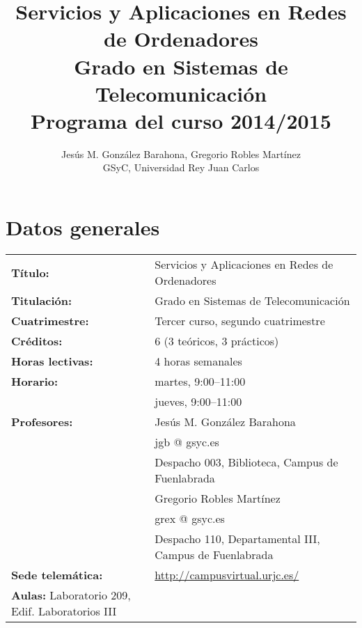 \documentclass[a4paper,12pt]{article}
\title{Servicios y Aplicaciones en Redes de Ordenadores \\
Grado en Sistemas de Telecomunicación \\
Programa del curso 2014/2015}
\author{Jesús M. González Barahona, Gregorio Robles Martínez \\
GSyC, Universidad Rey Juan Carlos}
\begin{document}
\maketitle

\tableofcontents

\newpage

\section{Datos generales}

\begin{tabular}{ll}
\textbf{Título:} & Servicios y Aplicaciones en Redes de Ordenadores  \\
\textbf{Titulación:} & Grado en Sistemas de Telecomunicación \\
\textbf{Cuatrimestre:} & Tercer curso, segundo cuatrimestre \\
\textbf{Créditos:} & 6 (3 teóricos, 3 prácticos) \\
\textbf{Horas lectivas:} & 4 horas semanales \\
\textbf{Horario:} & martes, 9:00--11:00 \\
                  & jueves, 9:00--11:00 \\
\textbf{Profesores:}
& Jesús M. González Barahona \\
& \hspace{1cm}jgb @ gsyc.es \\
& \hspace{1cm}Despacho 003, Biblioteca, Campus de Fuenlabrada\\
& Gregorio Robles Martínez\\
& \hspace{1cm}grex @ gsyc.es \\
& \hspace{1cm}Despacho 110, Departamental III, Campus de Fuenlabrada\\
\textbf{Sede telemática:} & \url{http://campusvirtual.urjc.es/} \\
\textbf{Aulas:} Laboratorio 209, Edif. Laboratorios III \\
\end{tabular}

\newpage

\end{document}
